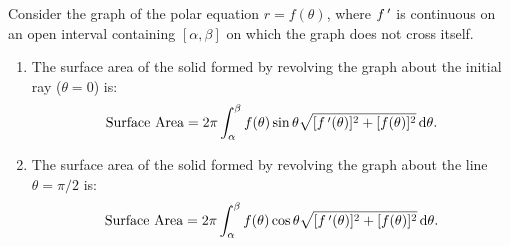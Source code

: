 \begin{keyidea}\label{idea:surface_area_polar}%
Consider the graph of the polar equation $r=f(\theta)$, where $f\,'$ is continuous on an open interval containing $[\alpha,\beta]$ on which the graph does not cross itself.
\begin{enumerate}
	\item The surface area of the solid formed by revolving the graph about the initial ray ($\theta=0$) is:
	\[\text{Surface Area} = 2\pi\int_\alpha^\beta f(\theta)\sin\theta\sqrt{[f\,'(\theta)]^2+[f(\theta)]^2}\operatorname{d}\!\theta.\]
	\item The surface area of the solid formed by revolving the graph about the line $\theta=\pi/2$ is:
	\[\text{Surface Area} = 2\pi\int_\alpha^\beta f(\theta)\cos\theta\sqrt{[f\,'(\theta)]^2+[f(\theta)]^2}\operatorname{d}\!\theta.\]
\end{enumerate}
\end{keyidea}


